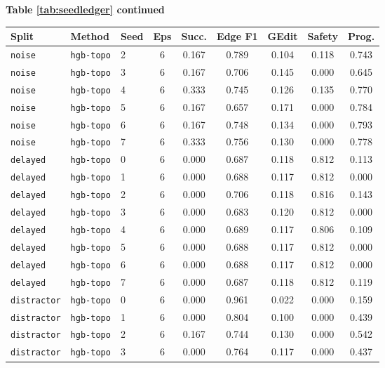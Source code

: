 \documentclass{article}
\begin{document}
\begin{center}
\textbf{Table \ref{tab:seedledger} continued}\\[0.4ex]
\begin{tabular}{lllcccccc}
\toprule
Split & Method & Seed & Eps & Succ. & Edge F1 & GEdit & Safety & Prog. \\
\midrule
\texttt{noise} & \texttt{hgb-topo} & 2 & 6 & 0.167 & 0.789 & 0.104 & 0.118 & 0.743 \\
\texttt{noise} & \texttt{hgb-topo} & 3 & 6 & 0.167 & 0.706 & 0.145 & 0.000 & 0.645 \\
\texttt{noise} & \texttt{hgb-topo} & 4 & 6 & 0.333 & 0.745 & 0.126 & 0.135 & 0.770 \\
\texttt{noise} & \texttt{hgb-topo} & 5 & 6 & 0.167 & 0.657 & 0.171 & 0.000 & 0.784 \\
\texttt{noise} & \texttt{hgb-topo} & 6 & 6 & 0.167 & 0.748 & 0.134 & 0.000 & 0.793 \\
\texttt{noise} & \texttt{hgb-topo} & 7 & 6 & 0.333 & 0.756 & 0.130 & 0.000 & 0.778 \\
\texttt{delayed} & \texttt{hgb-topo} & 0 & 6 & 0.000 & 0.687 & 0.118 & 0.812 & 0.113 \\
\texttt{delayed} & \texttt{hgb-topo} & 1 & 6 & 0.000 & 0.688 & 0.117 & 0.812 & 0.000 \\
\texttt{delayed} & \texttt{hgb-topo} & 2 & 6 & 0.000 & 0.706 & 0.118 & 0.816 & 0.143 \\
\texttt{delayed} & \texttt{hgb-topo} & 3 & 6 & 0.000 & 0.683 & 0.120 & 0.812 & 0.000 \\
\texttt{delayed} & \texttt{hgb-topo} & 4 & 6 & 0.000 & 0.689 & 0.117 & 0.806 & 0.109 \\
\texttt{delayed} & \texttt{hgb-topo} & 5 & 6 & 0.000 & 0.688 & 0.117 & 0.812 & 0.000 \\
\texttt{delayed} & \texttt{hgb-topo} & 6 & 6 & 0.000 & 0.688 & 0.117 & 0.812 & 0.000 \\
\texttt{delayed} & \texttt{hgb-topo} & 7 & 6 & 0.000 & 0.687 & 0.118 & 0.812 & 0.119 \\
\texttt{distractor} & \texttt{hgb-topo} & 0 & 6 & 0.000 & 0.961 & 0.022 & 0.000 & 0.159 \\
\texttt{distractor} & \texttt{hgb-topo} & 1 & 6 & 0.000 & 0.804 & 0.100 & 0.000 & 0.439 \\
\texttt{distractor} & \texttt{hgb-topo} & 2 & 6 & 0.167 & 0.744 & 0.130 & 0.000 & 0.542 \\
\texttt{distractor} & \texttt{hgb-topo} & 3 & 6 & 0.000 & 0.764 & 0.117 & 0.000 & 0.437 \\

\end{tabular}
\end{center}
\end{document}
